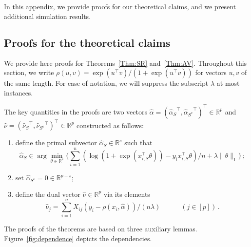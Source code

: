 \documentclass{elsarticle}
\def\T{\top}
\newcommand\norm[1]{\lVert#1\rVert}
\newcommand{\argmin}{\arg\!\min}
\newcommand{\tuning}{{\lambda}}
\newcommand{\R}{{\mathbb{R}}}
\newcommand{\primal}{{\hat{\alpha}}}
\newcommand{\prims}{{\hat{\alpha}_{S}}}
\newcommand{\primsc}{{\hat{\alpha}_{{S}^c}}}
\newcommand{\dual}{{\hat{\nu}}}
\newcommand{\duals}{{\hat{\nu}_{S}}}
\newcommand{\dualsc}{{\hat{\nu}_{{S}^c}}}
\newcommand{\dualj}{{\hat{\nu}_j}}
\newcommand{\redef}{=}
\begin{document}


\appendix



\section{}
In this appendix, we provide proofs for our theoretical claims, and we present additional simulation results.
\subsection{Proofs for the theoretical claims}

We provide here proofs for Theorems~\ref{Thm:SR} and~\ref{Thm:AV}.
Throughout this section, we write $\rho(u, v)=\exp(u^\T v)/(1+\exp(u^\T v))$ for vectors $u,v$ of the same length. For ease of notation, we will suppress the subscript $\tuning$ at most instances.

The key quantities in the proofs are two vectors     $\primal=(\prims^\T,\primsc^\T)^\T\in\R^p$ and $\dual=(\duals^\T,\dualsc^\T)^\T \in \R^p$ constructed as follows:

    \begin{enumerate}
      \item define the primal subvector $\prims \in \R^{s}$ such that
       \begin{equation*}
         \prims\in \argmin_{\theta\in \R^{s}}\bigg\{\sum_{i=1}^n(\log(1+\exp(x_{i,S}^\T
       \theta))-y_ix_{i,S}^\T\theta)/n+\tuning\norm{\theta}_1\bigg\}\,;
       \end{equation*}
\item set $\primsc=0\in \R^{p-s}$;
     \item      define the dual vector $\dual\in \R^{p}$ via its elements
      \begin{equation*}
        \dualj\redef \sum_{i=1}^nX_{ij}(y_i-\rho(x_{i},\primal))/(n\tuning)\qquad\quad (j\in[p])\,.
      \end{equation*}
    \end{enumerate}

    The proofs of the theorems are based on three auxiliary lemmas. Figure~\ref{fig:dependence} depicts the dependencies.
\end{document}
